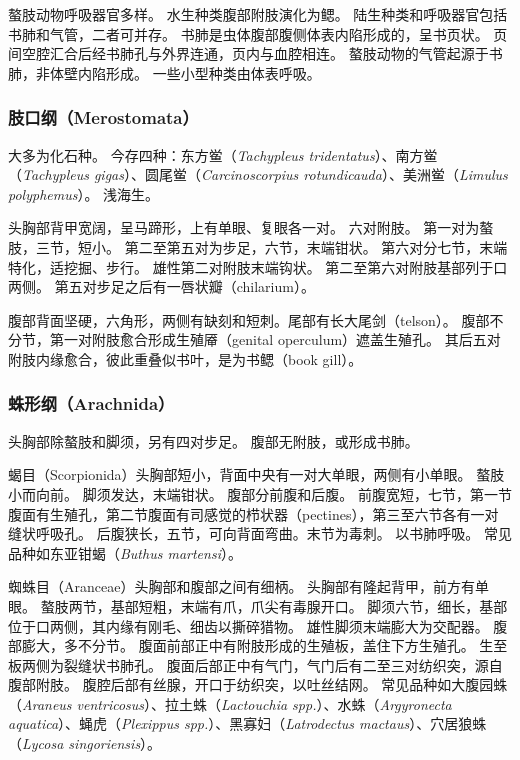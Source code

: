\documentclass[11pt]{article}
\begin{document}
\newline

螯肢动物呼吸器官多样。
水生种类腹部附肢演化为鳃。
陆生种类和呼吸器官包括书肺和气管，二者可并存。
书肺是虫体腹部腹侧体表内陷形成的，呈书页状。
页间空腔汇合后经书肺孔与外界连通，页内与血腔相连。
螯肢动物的气管起源于书肺，非体壁内陷形成。
一些小型种类由体表呼吸。

\subsubsection{肢口纲（Merostomata）}
大多为化石种。
今存四种：东方鲎（\textit{Tachypleus tridentatus}）、南方鲎（\textit{Tachypleus gigas}）、圆尾鲎（\textit{Carcinoscorpius rotundicauda}）、美洲鲎（\textit{Limulus polyphemus}）。
浅海生。

\newline

头胸部背甲宽阔，呈马蹄形，上有单眼、复眼各一对。
六对附肢。
第一对为螯肢，三节，短小。
第二至第五对为步足，六节，末端钳状。
第六对分七节，末端特化，适挖掘、步行。
雄性第二对附肢末端钩状。
第二至第六对附肢基部列于口两侧。
第五对步足之后有一唇状瓣（chilarium）。

\newline

腹部背面坚硬，六角形，两侧有缺刻和短刺。尾部有长大尾剑（telson）。
腹部不分节，第一对附肢愈合形成生殖厣（genital operculum）遮盖生殖孔。
其后五对附肢内缘愈合，彼此重叠似书叶，是为书鳃（book gill）。

\subsubsection{蛛形纲（Arachnida）}
头胸部除螯肢和脚须，另有四对步足。
腹部无附肢，或形成书肺。

\newline

蝎目（Scorpionida）头胸部短小，背面中央有一对大单眼，两侧有小单眼。
螯肢小而向前。
脚须发达，末端钳状。
腹部分前腹和后腹。
前腹宽短，七节，第一节腹面有生殖孔，第二节腹面有司感觉的栉状器（pectines），第三至六节各有一对缝状呼吸孔。
后腹狭长，五节，可向背面弯曲。末节为毒刺。
以书肺呼吸。
常见品种如东亚钳蝎（\textit{Buthus martensi}）。

\newline

蜘蛛目（Aranceae）头胸部和腹部之间有细柄。
头胸部有隆起背甲，前方有单眼。
螯肢两节，基部短粗，末端有爪，爪尖有毒腺开口。
脚须六节，细长，基部位于口两侧，其内缘有刚毛、细齿以撕碎猎物。
雄性脚须末端膨大为交配器。
腹部膨大，多不分节。
腹面前部正中有附肢形成的生殖板，盖住下方生殖孔。
生至板两侧为裂缝状书肺孔。
腹面后部正中有气门，气门后有二至三对纺织突，源自腹部附肢。
腹腔后部有丝腺，开口于纺织突，以吐丝结网。
常见品种如大腹园蛛（\textit{Araneus ventricosus}）、拉土蛛（\textit{Lactouchia spp.}）、水蛛（\textit{Argyronecta aquatica}）、蝇虎（\textit{Plexippus spp.}）、黑寡妇（\textit{Latrodectus mactaus}）、穴居狼蛛（\textit{Lycosa singoriensis}）。
\end{document}
